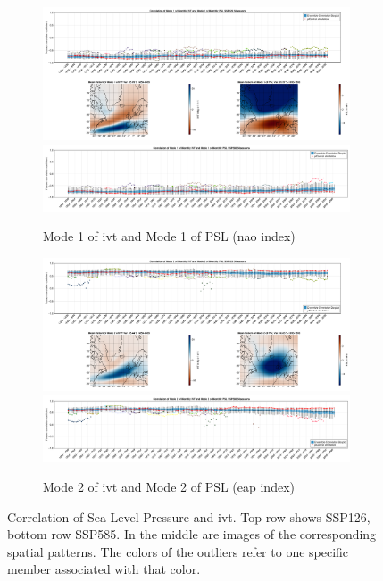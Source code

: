 \begin{figure}[!tbp]
  \begin{subfigure}[b]{0.75\textwidth}
        \includegraphics[width=\textwidth]{figures/correlation_boxplot_ivt_psl_modes11_ssp126_50seasons.png}
        \includegraphics[width=\textwidth]{figures/correlation_boxplot_ivt_psl_modes11_ssp585_50seasons.png}
    \caption{Mode 1 of \ac{ivt} and Mode 1 of PSL (\ac{nao} index)}
    \label{fig:cor ivt psl modes11}
  \end{subfigure}
  \hfill
  \begin{subfigure}[b]{0.75\textwidth}
        \includegraphics[width=\textwidth]{figures/correlation_boxplot_ivt_psl_modes22_ssp126_50seasons.png}
        \includegraphics[width=\textwidth]{figures/correlation_boxplot_ivt_psl_modes22_ssp585_50seasons.png}
    \caption{Mode 2 of \ac{ivt} and Mode 2 of PSL (\ac{eap} index)}
    \label{fig:cor ivt psl modes22}
  \end{subfigure}
  \caption{Correlation of Sea Level Pressure and \ac{ivt}. Top row shows SSP126, bottom row SSP585. In the middle are images of the corresponding spatial patterns. The colors of the outliers refer to one specific member associated with that color.}
\end{figure}

